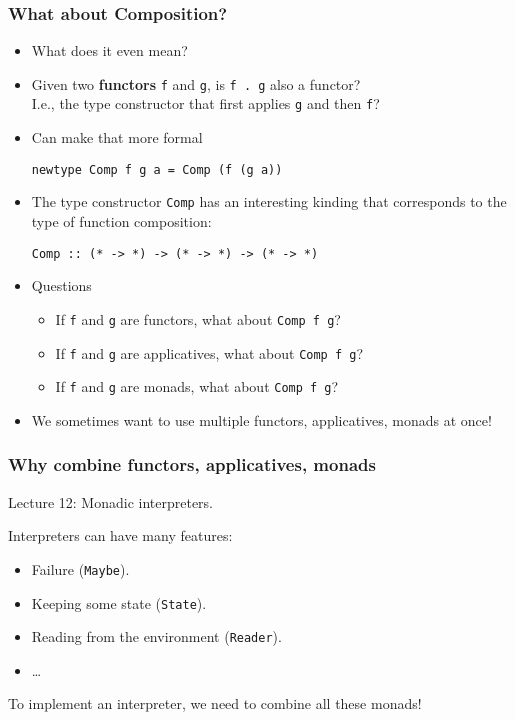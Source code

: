 \documentclass[pdftex,aspectratio=169]{beamer}
\begin{document}
\begin{frame}[fragile]
  \frametitle{What about Composition?}
  \begin{itemize}[<+->]
  \item What does it even mean?
  \item Given two \textbf{functors} \lstinline{f} and \lstinline{g},
    is \lstinline{f . g} also a functor?\\
    I.e., the type constructor
    that first applies \lstinline{g} and then \lstinline{f}?
  \item Can make that more formal
\begin{lstlisting}
newtype Comp f g a = Comp (f (g a))
\end{lstlisting}
  \item The type constructor \lstinline{Comp} has an interesting
    kinding that corresponds to the type of function composition:
\begin{lstlisting}
Comp :: (* -> *) -> (* -> *) -> (* -> *)
\end{lstlisting}
  \item Questions
    \begin{itemize}
    \item If \lstinline{f} and \lstinline{g} are functors, what about
      \lstinline{Comp f g}?
    \item If \lstinline{f} and \lstinline{g} are applicatives, what about
      \lstinline{Comp f g}?
    \item If \lstinline{f} and \lstinline{g} are monads, what about
      \lstinline{Comp f g}?
    \end{itemize}
  \item We sometimes want to use multiple functors, applicatives, monads at once! 
  \end{itemize}
\end{frame}

\begin{frame}
  \frametitle{Why combine functors, applicatives, monads}
  Lecture 12: Monadic interpreters.

  Interpreters can have many features:
  \begin{itemize}
  \item Failure (\lstinline{Maybe}).
  \item Keeping some state (\lstinline{State}).
  \item Reading from the environment (\lstinline{Reader}).
  \item \dots
  \end{itemize}

  To implement an interpreter, we need to combine all these monads!
\end{frame}
\end{document}
